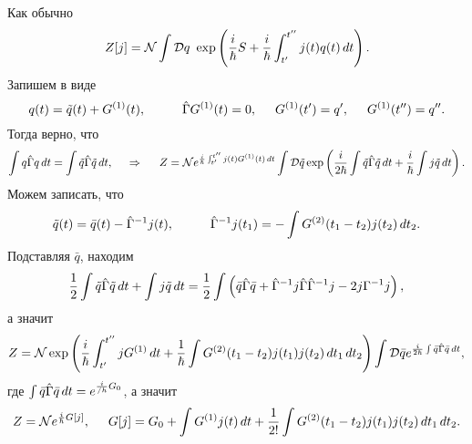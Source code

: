 Как обычно
\begin{equation*}
    Z[j] = \mathcal N \int \mathcal D q\ \exp\left(
        \frac{i}{\hbar}S + \frac{i}{\hbar} \int_{t'}^{t''} j(t) q(t) \, d t
    \right).
\end{equation*}
Запишем в виде
\begin{equation*}
    q(t) = \tilde{q}(t) + G^{(1)} (t),
    \hspace{10 mm}
    \hat{\Gamma} G^{(1)} (t) = 0,
    \hspace{5 mm} 
    G^{(1)} (t') = q',
    \hspace{5 mm} 
    G^{(1)}(t'') = q''.
\end{equation*}
Тогда верно, что
\begin{equation*}
    \int q \hat{\Gamma} q \, d t = \int \tilde{q} \hat{\Gamma} \tilde{q} \, d t,
    \hspace{0.5cm} \Rightarrow \hspace{0.5cm}
    Z = \mathcal N e^{\frac{i}{\hbar}\int_{t'}^{t''} j(t) G^{(1)} (t) \, d t} \int \mathcal D \tilde{q} \exp\left(
        \frac{i}{2\hbar} \int \tilde{q} \hat{\Gamma} \tilde{q} \, d t + \frac{i}{\hbar} \int j \tilde{q} \, d t
    \right).
\end{equation*}
Можем записать, что
\begin{equation*}
    \tilde{q}(t) = \bar{q}(t) - \hat{\Gamma}^{-1} j(t),
    \hspace{10 mm} 
    \hat{\Gamma}^{-1} j(t_1) = - \int G^{(2)} (t_1-t_2) j(t_2) \d t_2.
\end{equation*}
Подставляя $\bar{q}$, находим
\begin{equation*}
    \frac{1}{2} \int \tilde{q} \hat{\Gamma} \tilde{q} \, d t + \int j \tilde{q} \, d t = 
    \frac{1}{2} \int \left(
        \bar{q} \hat{\Gamma} \bar{q} + \hat{\Gamma}^{-1} j \hat{\Gamma} \hat{\Gamma}^{-1} j - 2 j \Gamma^{-1} j
    \right),
\end{equation*}
а значит
\begin{equation*}
    Z = \mathcal N \exp\left(
        \frac{i}{\hbar} \int_{t'}^{t''} j G^{(1)} \, d t + \frac{1}{\hbar} 
        \int G^{(2)} (t_1 - t_2) j(t_1) j(t_2) \, d t_1 \, d t_2
    \right) 
    \int \mathcal D \bar{q} e^{\frac{i}{2\hbar} \int \bar{q} \hat{\Gamma} \bar{q} \, d t},
\end{equation*}
где $\int \bar{q} \hat{\Gamma} \bar{q} \, d t = e^{\frac{i}{/h} G_0}$, а значит
\begin{equation*}
    Z = \mathcal N e^{\frac{i}{\hbar} G[j]},
    \hspace{5 mm} 
    G[j] = G_0 + \int G^{(1)} j(t) \, d t + \frac{1}{2!} \int G^{(2)} (t_1-t_2) j(t_1) j(t_2) \, d t_1 \, d t_2.
\end{equation*}

